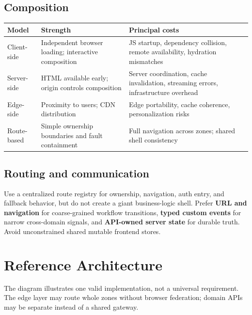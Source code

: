 \documentclass[11pt,letterpaper,oneside]{report}
\newcommand{\term}[1]{\textbf{\color{navy}#1}}
\begin{document}
\section{Composition}
\begin{tabularx}{\linewidth}{>{\raggedright\arraybackslash}p{.19\linewidth}>{\raggedright\arraybackslash}X >{\raggedright\arraybackslash}X}\toprule Model & Strength & Principal costs \\\midrule
Client-side & Independent browser loading; interactive composition & JS startup, dependency collision, remote availability, hydration mismatches\\
Server-side & HTML available early; origin controls composition & Server coordination, cache invalidation, streaming errors, infrastructure overhead\\
Edge-side & Proximity to users; CDN distribution & Edge portability, cache coherence, personalization risks\\
Route-based & Simple ownership boundaries and fault containment & Full navigation across zones; shared shell consistency\\\bottomrule\end{tabularx}
\section{Routing and communication}
Use a centralized route registry for ownership, navigation, auth entry, and fallback behavior, but do not create a giant business-logic shell. Prefer \term{URL and navigation} for coarse-grained workflow transitions, \term{typed custom events} for narrow cross-domain signals, and \term{API-owned server state} for durable truth. Avoid unconstrained shared mutable frontend stores.
\chapter{Reference Architecture}
\begin{center}
\end{center}
\noindent The diagram illustrates one valid implementation, not a universal requirement. The edge layer may route whole zones without browser federation; domain APIs may be separate instead of a shared gateway.
\end{document}

